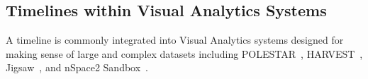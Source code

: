 

\subsection{Timelines within Visual Analytics Systems}
A timeline is commonly integrated into Visual Analytics systems designed for making sense of large and complex datasets including POLESTAR~\cite{Pioch2006}, HARVEST~\cite{Gotz2006}, Jigsaw~\cite{Stasko2007, Gorg2013}, and nSpace2 Sandbox~\cite{Wright2006, SandboxTimeline2012}. 

